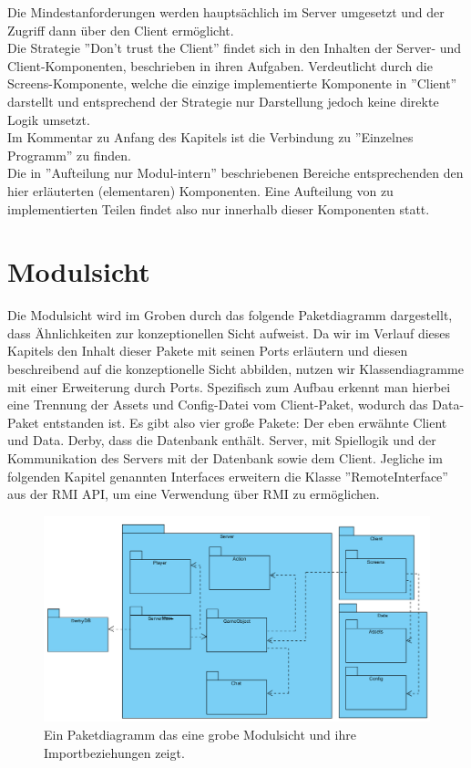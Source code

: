 \documentclass[fontsize=12pt,paper=a4,twoside]{scrartcl}
\begin{document}
 Die Mindestanforderungen werden hauptsächlich im Server umgesetzt und der Zugriff dann über den Client ermöglicht. \\

Die Strategie ''Don't trust the Client'' findet sich in den Inhalten der Server- und Client-Komponenten, beschrieben in ihren Aufgaben. Verdeutlicht durch die Screens-Komponente, welche die einzige implementierte Komponente in ''Client'' darstellt und entsprechend der Strategie nur Darstellung jedoch keine direkte Logik umsetzt. \\

Im Kommentar zu Anfang des Kapitels ist die Verbindung zu ''Einzelnes Programm'' zu finden. \\ 

Die in ''Aufteilung nur Modul-intern'' beschriebenen Bereiche entsprechenden den hier erläuterten (elementaren) Komponenten. Eine Aufteilung von zu implementierten Teilen findet also nur innerhalb dieser Komponenten statt.\\


\section{Modulsicht}
\label{sec:modulsicht}
Die Modulsicht wird im Groben durch das folgende Paketdiagramm dargestellt, dass Ähnlichkeiten zur konzeptionellen Sicht aufweist. Da wir im Verlauf dieses Kapitels den Inhalt dieser Pakete mit seinen Ports erläutern und diesen beschreibend auf die konzeptionelle Sicht abbilden, nutzen wir Klassendiagramme mit einer Erweiterung durch Ports. Spezifisch zum Aufbau erkennt man hierbei eine Trennung der Assets und Config-Datei vom Client-Paket, wodurch das Data-Paket entstanden ist. Es gibt also vier große Pakete: Der eben erwähnte Client und Data. Derby, dass die Datenbank enthält. Server, mit Spiellogik und der Kommunikation des Servers mit der Datenbank sowie dem Client. Jegliche im folgenden Kapitel genannten Interfaces erweitern die Klasse ''RemoteInterface'' aus der RMI API, um eine Verwendung über RMI zu ermöglichen.

\begin{figure}[h]
\centering
\includegraphics[width=1.0\linewidth]{Paketdiagramm}
\caption{Ein Paketdiagramm das eine grobe Modulsicht und ihre Importbeziehungen zeigt.}
\label{fig:Paketdiagramm}
\end{figure}
\end{document}
